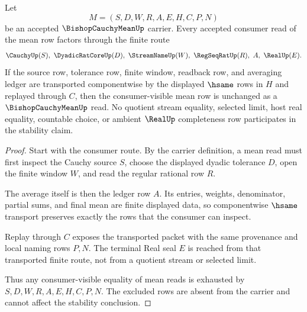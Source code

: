 \begin{theorem}
\label{thm:bishop-cauchy-mean-finite-average-stability}
Let
$$
M=(S,D,W,R,A,E,H,C,P,N)
$$
be an accepted $\BishopCauchyMeanUp$ carrier. Every accepted consumer read of the mean row factors through the finite route
$$
\CauchyUp(S),\ \DyadicRatCoreUp(D),\ \StreamNameUp(W),\ \RegSeqRatUp(R),\ A,\ \RealUp(E).
$$
If the source row, tolerance row, finite window, readback row, and averaging ledger are transported componentwise by the displayed $\hsame$ rows in $H$ and replayed through $C$, then the consumer-visible mean row is unchanged as a $\BishopCauchyMeanUp$ read. No quotient stream equality, selected limit, host real equality, countable choice, or ambient $\RealUp$ completeness row participates in the stability claim.
\end{theorem}
\begin{proof}
Start with the consumer route. By the carrier definition, a mean read must first inspect the Cauchy source $S$, choose the displayed dyadic tolerance $D$, open the finite window $W$, and read the regular rational row $R$.

The average itself is then the ledger row $A$. Its entries, weights, denominator, partial sums, and final mean are finite displayed data, so componentwise $\hsame$ transport preserves exactly the rows that the consumer can inspect.

Replay through $C$ exposes the transported packet with the same provenance and local naming rows $P,N$. The terminal Real seal $E$ is reached from that transported finite route, not from a quotient stream or selected limit.

Thus any consumer-visible equality of mean reads is exhausted by $S,D,W,R,A,E,H,C,P,N$. The excluded rows are absent from the carrier and cannot affect the stability conclusion.
\end{proof}



